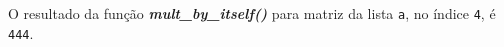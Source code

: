 \documentclass[12pt,varwidth=16cm,border=1pt]{standalone}
\begin{document}
O resultado da função \textbf{\textit{mult\_by\_itself()}} para matriz da lista \verb+a+, no índice \verb+4+, é \verb+444+.

\questiomfalse
\end{document}
